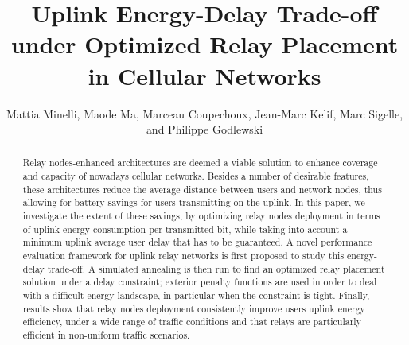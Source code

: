 \documentclass[draftcls,onecolumn]{IEEEtran}
\theoremstyle{plain}
\theoremstyle{definition}
\begin{document}
\title{Uplink Energy-Delay Trade-off under Optimized Relay Placement in Cellular Networks}

\author{Mattia Minelli,
        Maode Ma,
        Marceau Coupechoux,
        Jean-Marc Kelif,
        Marc Sigelle,
        and Philippe Godlewski }














\maketitle

\begin{abstract}
Relay nodes-enhanced architectures are deemed a viable solution to enhance coverage and capacity of nowadays cellular networks. Besides a number of desirable features, these architectures reduce the average distance between users and network nodes, thus allowing for battery savings for users transmitting on the uplink. In this paper, we investigate the extent of these savings, by optimizing relay nodes deployment in terms of uplink energy consumption per transmitted bit, while taking into account a minimum uplink average user delay that has to be guaranteed. A novel performance evaluation framework for uplink relay networks is first proposed to study this energy-delay trade-off. A simulated annealing is then run to find an optimized relay placement solution under a delay constraint; exterior penalty functions are used in order to deal with a difficult energy landscape, in particular when the constraint is tight. Finally, results show that relay nodes deployment consistently improve users uplink energy efficiency, under a wide range of traffic conditions and that relays are particularly efficient in non-uniform traffic scenarios.
\end{abstract}
\vspace{1cm}
\justify
\end{document}
